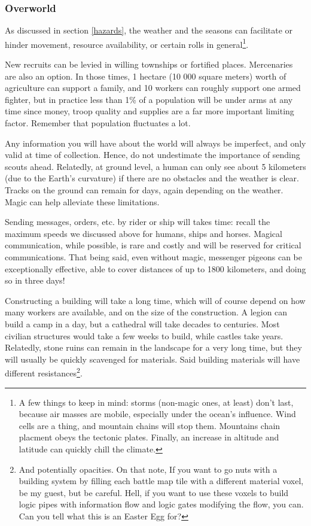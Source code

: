 \subsubsection{Overworld}



As discussed in section \ref{hazards}, the weather and the seasons can facilitate or hinder movement, resource availability, or certain rolls in general\footnote{A few things to keep in mind: storms (non-magic ones, at least) don't last, because air masses are mobile, especially under the ocean's influence. Wind cells are a thing, and mountain chains will stop them. Mountains chain placment obeys the tectonic plates. Finally, an increase in altitude and latitude can quickly chill the climate.}. 

New recruits can be levied in willing townships or fortified places. Mercenaries are also an option. In those times, 1 hectare (10 000 square meters) worth of agriculture can support a family, and 10 workers can roughly support one armed fighter, but in practice less than 1\% of a population will be under arms at any time since money, troop quality and supplies are a far more important limiting factor. Remember that population fluctuates a lot.

Any information you will have about the world will always be imperfect, and only valid at time of collection. Hence, do not undestimate the importance of sending scouts ahead. Relatedly, at ground level, a human can only see about 5 kilometers (due to the Earth's curvature) if there are no obstacles and the weather is clear. Tracks on the ground can remain for days, again depending on the weather. Magic can help alleviate these limitations. 

Sending messages, orders, etc. by rider or ship will takes time: recall the maximum speeds we discussed above for humans, ships and horses. Magical communication, while possible, is rare and costly and will be reserved for critical communications. That being said, even without magic, messenger pigeons can be exceptionally effective, able to cover distances of up to 1800 kilometers, and doing so in three days!

Constructing a building will take a long time, which will of course depend on how many workers are available, and on the size of the construction. A legion can build a camp in a day, but a cathedral will take decades to centuries. Most civilian structures would take a few weeks to build, while castles take years. Relatedly, stone ruins can remain in the landscape for a very long time, but they will usually be quickly scavenged for materials. Said building materials will have different resistances\footnote{And potentially opacities. On that note, If you want to go nuts with a building system by filling each battle map tile with a different material voxel, be my guest, but be careful. Hell, if you want to use these voxels to build logic pipes with information flow and logic gates modifying the flow, you can. Can you tell what this is an Easter Egg for?}.



